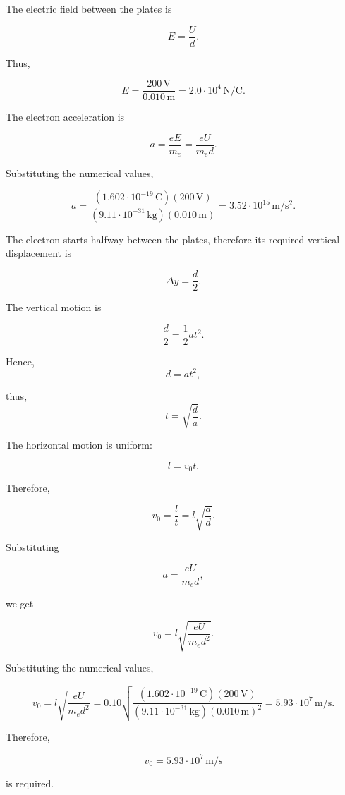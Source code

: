 \documentclass[a4paper,12pt]{letter}
\begin{document}
\begin{enumerate}
\begin{center}
\end{center}


The electric field between the plates is

$$E=\frac{U}{d}.$$

Thus,

$$E=\frac{200\,\mathrm{V}}{0.010\,\mathrm{m}}=2.0\cdot10^4\,\mathrm{N/C}.$$

The electron acceleration is

$$a=\frac{eE}{m_e}=\frac{eU}{m_e d}.$$

Substituting the numerical values,

$$a=\frac{(1.602\cdot10^{-19}\,\mathrm{C})(200\,\mathrm{V})}{(9.11\cdot10^{-31}\,\mathrm{kg})(0.010\,\mathrm{m})}=3.52\cdot10^{15}\,\mathrm{m/s^2}.$$

The electron starts halfway between the plates, therefore its required vertical displacement is

$$\Delta y=\frac{d}{2}.$$

The vertical motion is

$$\frac{d}{2}=\frac12 at^2.$$

Hence,
$$d=at^2,$$

thus,
$$t=\sqrt{\frac{d}{a}}.$$

The horizontal motion is uniform:

$$l=v_0 t.$$

\pagebreak
Therefore,

$$v_0=\frac{l}{t}=l\sqrt{\frac{a}{d}}.$$

Substituting

$$a=\frac{eU}{m_e d},$$

we get

$$v_0=l\sqrt{\frac{eU}{m_e d^2}}.$$

Substituting the numerical values,

$$v_0=l\sqrt{\frac{eU}{m_e d^2}}=0.10\sqrt{\frac{(1.602\cdot10^{-19}\,\mathrm{C})(200\,\mathrm{V})}{(9.11\cdot10^{-31}\,\mathrm{kg})(0.010\,\mathrm{m})^2}}=5.93\cdot10^7\,\mathrm{m/s}.$$

Therefore,

$$\boxed{v_0=5.93\cdot10^7\,\mathrm{m/s}}$$

is required.

\bigskip


\end{enumerate}

\bigskip


\vfill
\end{document}
